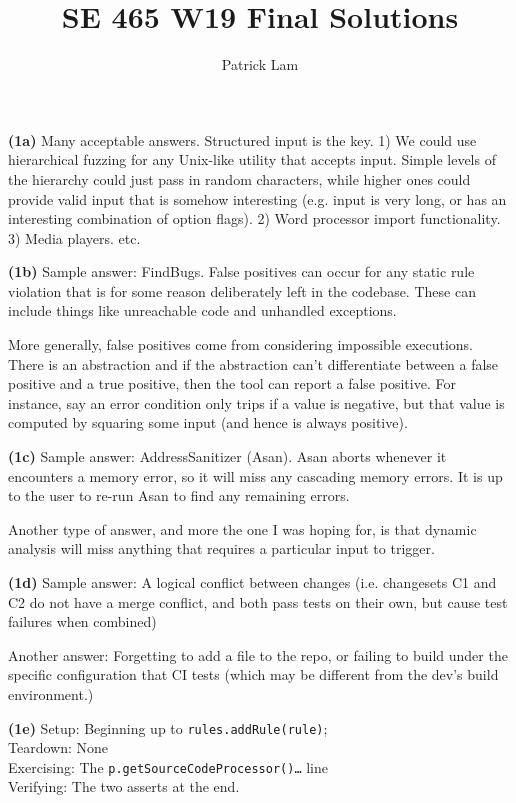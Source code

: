 \documentclass[11pt,onecolumn,letterpaper]{article}
\title{SE 465 W19 Final Solutions}
\author{Patrick Lam}
\newcounter{qNum}
\newcommand{\q}[1]{%
\textbf{(#1)}\stepcounter{qNum}}
\begin{document}
\vspace{-12em}

\maketitle

\q{1a} Many acceptable answers. Structured input is the key. 1) We
could use hierarchical fuzzing for any Unix-like utility that accepts
input. Simple levels of the hierarchy could just pass in random
characters, while higher ones could provide valid input that is
somehow interesting (e.g.  input is very long, or has an interesting
combination of option flags). 2) Word processor import functionality.
3) Media players. etc.

\q{1b} Sample answer:
FindBugs. False positives can occur for any static rule violation that
is for some reason deliberately left in the codebase. These can include
things like unreachable code and unhandled exceptions.

More generally, false positives come from considering impossible
executions. There is an abstraction and if the abstraction can't
differentiate between a false positive and a true positive, then
the tool can report a false positive. For instance, say an error
condition only trips if a value is negative, but that value
is computed by squaring some input (and hence is always positive).

\q{1c} Sample answer: AddressSanitizer (Asan). Asan aborts whenever it encounters a memory
error, so it will miss any cascading memory errors. It is up to the
user to re-run Asan to find any remaining errors.

Another type of answer, and more the one I was hoping for, is
that dynamic analysis will miss anything that requires a particular
input to trigger.

\q{1d} Sample answer: A logical conflict between changes (i.e. changesets C1 and C2
do not have a merge conflict, and both pass tests on their own,
but cause test failures when combined)

Another answer: Forgetting to add a file to the repo, or failing to build under the
specific configuration that CI tests (which may be different from the dev's build environment.)

\q{1e}
Setup: Beginning up to {\tt rules.addRule(rule)};\\
Teardown: None\\
Exercising: The {\tt p.getSourceCodeProcessor()\ldots} line\\
Verifying: The two asserts at the end.
\end{document}
